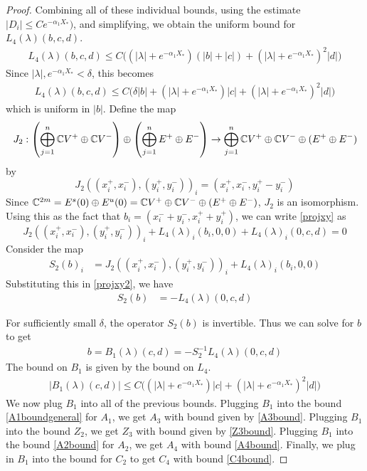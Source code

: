 \documentclass[thesis.tex]{subfiles}
\begin{document}
\begin{lemma}
\begin{proof}
Combining all of these individual bounds, using the estimate $|D_i| \leq C e^{-\alpha_1 X_*})$, and simplifying, we obtain the uniform bound for $L_4(\lambda)(b, c, d)$.
\begin{align*}
L_4(\lambda)(b, c, d) \leq 
C\Big( (|\lambda| + e^{-\alpha_1 X_*})(|b| + |c|) + (|\lambda| + e^{-\alpha_1 X_*})^2 |d|  \Big) 
\end{align*}
Since $|\lambda|, e^{-\alpha_1 X_*} < \delta$, this becomes
\begin{align*}
L_4(\lambda)(b, c, d) \leq 
C\Big( \delta |b| + (|\lambda| + e^{-\alpha_1 X_*})|c| + (|\lambda| + e^{-\alpha_1 X_*})^2 |d| \Big) 
\end{align*}
which is uniform in $|b|$. Define the map
\[
J_2: \left( \bigoplus_{j=1}^n \mathbb{C} V^+ \oplus \mathbb{C} V^- \right) \oplus
\left( \bigoplus_{j=1}^n E^+ \oplus E^- \right) 
\rightarrow \bigoplus_{j=1}^n \mathbb{C} V^+ \oplus \mathbb{C} V^- \oplus (E^+ \oplus E^-)
\]
by 
\[
J_2( (x_i^+, x_i^-),(y_i^+, y_i^-))_i = ( x_i^+, x_i^-, y_i^+ - y_i^- )
\]
Since $\mathbb{C}^{2m} = E^s(0) \oplus E^u(0) = \mathbb{C} V^+ \oplus \mathbb{C} V^- \oplus (E^+ \oplus E^-)$, $J_2$ is an isomorphism. Using this as the fact that $b_i = (x_i^- + y_i^-, x_i^+ + y_i^+)$, we can write \eqref{projxy} as
\begin{equation}\label{projxy2}
J_2( (x_i^+, x_i^-),(y_i^+, y_i^-))_i 
+ L_4(\lambda)_i(b_i, 0, 0) + L_4(\lambda)_i(0, c, d) = 0
\end{equation}
Consider the map
\begin{align*}
S_2(b)_i &= J_2( (x_i^+, x_i^-),(y_i^+, y_i^-))_i 
+ L_4(\lambda)_i(b_i, 0, 0) 
\end{align*}
Substituting this in \eqref{projxy2}, we have
\begin{align*}
S_2(b) &= -L_4(\lambda)(0, c, d)
\end{align*}

For sufficiently small $\delta$, the operator $S_2(b)$ is invertible. Thus we can solve for $b$ to get
\begin{align}
b = B_1(\lambda)(c,d) 
= -S_2^{-1} L_4(\lambda)(0, c, d)
\end{align}
The bound on $B_1$ is given by the bound on $L_4$.
\begin{align*}
|B_1(\lambda)(c, d)| \leq C\Big( (|\lambda| + e^{-\alpha_1 X_*})|c| + (|\lambda| + e^{-\alpha_1 X_*})^2 |d| \Big) 
\end{align*}
We now plug $B_1$ into all of the previous bounds. Plugging $B_1$ into the bound \eqref{A1boundgeneral} for $A_1$, we get $A_3$ with bound given by \cref{A3bound}. Plugging $B_1$ into the bound $Z_2$, we get $Z_3$ with bound given by \cref{Z3bound}. Plugging $B_1$ into the bound \eqref{A2bound} for $A_2$, we get $A_4$ with bound \cref{A4bound}. Finally, we plug in $B_1$ into the bound for $C_2$ to get $C_4$ with bound \cref{C4bound}.
\end{proof}
\end{lemma}
\end{document}
